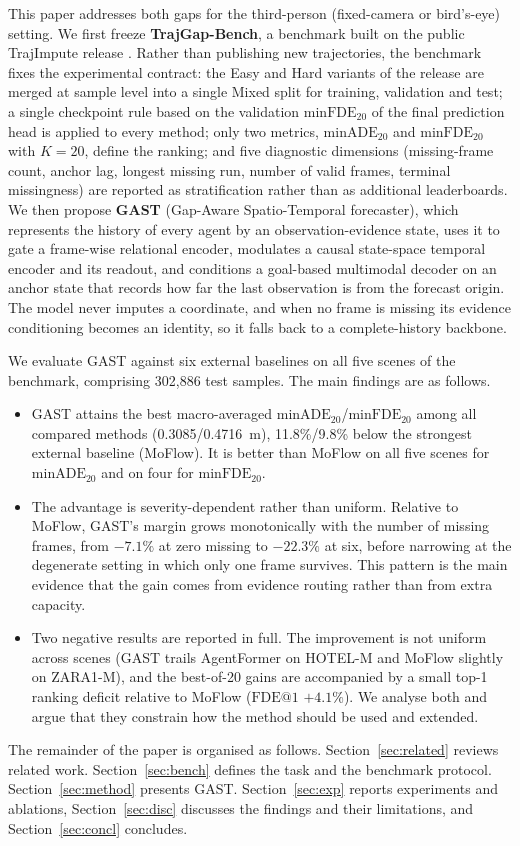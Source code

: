 This paper addresses both gaps for the third-person (fixed-camera or bird's-eye) setting. We first freeze \textbf{TrajGap-Bench}, a benchmark built on the public TrajImpute release \cite{chib2024pedestrian}. Rather than publishing new trajectories, the benchmark fixes the experimental contract: the Easy and Hard variants of the release are merged at sample level into a single Mixed split for training, validation and test; a single checkpoint rule based on the validation $\mathrm{minFDE}_{20}$ of the final prediction head is applied to every method; only two metrics, $\mathrm{minADE}_{20}$ and $\mathrm{minFDE}_{20}$ with $K=20$, define the ranking; and five diagnostic dimensions (missing-frame count, anchor lag, longest missing run, number of valid frames, terminal missingness) are reported as stratification rather than as additional leaderboards. We then propose \textbf{GAST} (Gap-Aware Spatio-Temporal forecaster), which represents the history of every agent by an observation-evidence state, uses it to gate a frame-wise relational encoder, modulates a causal state-space temporal encoder and its readout, and conditions a goal-based multimodal decoder on an anchor state that records how far the last observation is from the forecast origin. The model never imputes a coordinate, and when no frame is missing its evidence conditioning becomes an identity, so it falls back to a complete-history backbone.

We evaluate GAST against six external baselines on all five scenes of the benchmark, comprising 302{,}886 test samples. The main findings are as follows.
\begin{itemize}
\item GAST attains the best macro-averaged $\mathrm{minADE}_{20}$/$\mathrm{minFDE}_{20}$ among all compared methods (0.3085/0.4716~m), 11.8\%/9.8\% below the strongest external baseline (MoFlow). It is better than MoFlow on all five scenes for $\mathrm{minADE}_{20}$ and on four for $\mathrm{minFDE}_{20}$.
\item The advantage is severity-dependent rather than uniform. Relative to MoFlow, GAST's margin grows monotonically with the number of missing frames, from $-7.1\%$ at zero missing to $-22.3\%$ at six, before narrowing at the degenerate setting in which only one frame survives. This pattern is the main evidence that the gain comes from evidence routing rather than from extra capacity.
\item Two negative results are reported in full. The improvement is not uniform across scenes (GAST trails AgentFormer on HOTEL-M and MoFlow slightly on ZARA1-M), and the best-of-20 gains are accompanied by a small top-1 ranking deficit relative to MoFlow ($\mathrm{FDE@1}$ $+4.1\%$). We analyse both and argue that they constrain how the method should be used and extended.
\end{itemize}

The remainder of the paper is organised as follows. Section~\ref{sec:related} reviews related work. Section~\ref{sec:bench} defines the task and the benchmark protocol. Section~\ref{sec:method} presents GAST. Section~\ref{sec:exp} reports experiments and ablations, Section~\ref{sec:disc} discusses the findings and their limitations, and Section~\ref{sec:concl} concludes.
